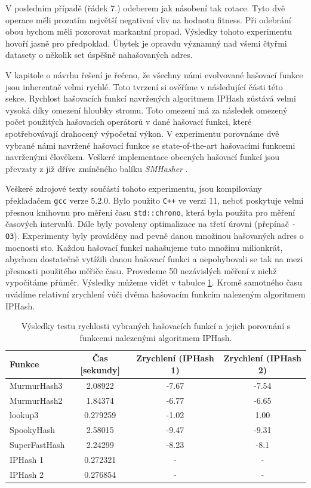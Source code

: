 V posledním případě (řádek 7.) odeberem jak násobení tak rotace. Tyto dvě operace měli prozatím největší negativní
vliv na hodnotu fitness. Při odebrání obou bychom měli pozorovat markantní propad. Výsledky tohoto experimentu 
hovoří jasně pro předpoklad. Úbytek je opravdu významný nad všemi čtyřmi datasety o několik set úspěšně nahašovaných adres.

V kapitole o návrhu řešení je řečeno, že všechny námi evolvované hašovací funkce jsou inherentně velmi rychlé. Toto
tvrzení si ověříme v následující části této sekce. Rychlost hašovacích funkcí navržených algoritmem IPHash zůstává
velmi vysoká díky omezení hloubky stromu. Toto omezení má za následek omezený počet použitých hašovacích operátorů v
dané hašovací funkci, které spotřebovávají drahocený výpočetní výkon. V experimentu porovnáme dvě vybrané námi navržené
hašovací funkce se state-of-the-art hašovacími funkcemi navrženými člověkem. Veškeré implementace obecných hašovací funkcí
jsou převzaty z již dříve zmíněného balíku \textit{SMHasher} \cite{appleby2016}. 

Veškeré zdrojové texty součástí tohoto experimentu,
jsou kompilovány překladačem \texttt{gcc} verze 5.2.0. Bylo použito \texttt{C++} ve verzi 11, neboť poskytuje velmi
přesnou knihovnu pro měření času \texttt{std::chrono}, která byla použita pro měření časových intervalů. Dále byly
povoleny optimalizace na třetí úrovni (přepínač \texttt{-O3}). Experimenty byly prováděny nad pevně danou množinou
hašovaných adres o mocnosti sto. Každou hašovací funkcí nahašujeme tuto množinu milionkrát, abychom dostatečně 
vytížili danou hašovací funkci a nepohybovali se tak na mezi přesnosti použitého měřiče času. Provedeme 50 nezávislých
měření z nichž vypočítáme přůměr. Výsledky můžeme vidět v tabulce \ref{tab:speedcomparison}. Kromě samotného času
uvádíme relativní zrychlení vůči dvěma hašovacím funkcím nalezeným algoritmem IPHash.

\begin{table}[!ht]
	\centering
	\caption{Výsledky testu rychlosti vybraných hašovacích funkcí a jejich porovnání s funkcemi nalezenými algoritmem IPHash.}
	\begin{tabular}{lccc}
		\hline
		Funkce & Čas [sekundy]  & Zrychlení (IPHash 1) & Zrychlení (IPHash 2) \\ 
		\hline
		MurmurHash3   & 2.08922  & -7.67 & -7.54 \\
		MurmurHash2   & 1.84374  & -6.77 & -6.65 \\
		lookup3       & 0.279259 & -1.02 &  1.00 \\
		SpookyHash    & 2.58015  & -9.47 & -9.31 \\
		SuperFastHash & 2.24299  & -8.23 & -8.1  \\ 
		\hline
		IPHash 1      & 0.272321 & - & - \\
		IPHash 2      & 0.276854 & - & - \\
		\hline
	\end{tabular}	
	\label{tab:speedcomparison}
\end{table}

